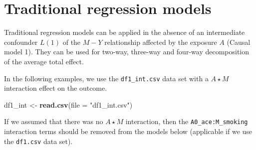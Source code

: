 \documentclass[
]{book}
\newenvironment{Shaded}{\begin{snugshade}}{\end{snugshade}}
\newcommand{\AttributeTok}[1]{\textcolor[rgb]{0.13,0.29,0.53}{#1}}
\newcommand{\CommentTok}[1]{\textcolor[rgb]{0.56,0.35,0.01}{\textit{#1}}}
\newcommand{\FunctionTok}[1]{\textcolor[rgb]{0.13,0.29,0.53}{\textbf{#1}}}
\newcommand{\NormalTok}[1]{#1}
\newcommand{\OtherTok}[1]{\textcolor[rgb]{0.56,0.35,0.01}{#1}}
\newcommand{\SpecialCharTok}[1]{\textcolor[rgb]{0.81,0.36,0.00}{\textbf{#1}}}
\newcommand{\StringTok}[1]{\textcolor[rgb]{0.31,0.60,0.02}{#1}}
\begin{document}
\begin{Shaded}
\end{Shaded}

\chapter{Traditional regression models}\label{ChapTradRegModels}

Traditional regression models can be applied in the absence of an intermediate confounder \(L(1)\) of the \(M-Y\) relationship affected by the exposure \(A\) (Causal model 1). They can be used for two-way, three-way and four-way decomposition of the average total effect.

In the following examples, we use the \texttt{df1\_int.csv} data set with a \(A \star M\) interaction effect on the outcome.

\begin{Shaded}
\begin{Highlighting}[]
\NormalTok{df1\_int }\OtherTok{\textless{}{-}} \FunctionTok{read.csv}\NormalTok{(}\AttributeTok{file =} \StringTok{"df1\_int.csv"}\NormalTok{)}
\end{Highlighting}
\end{Shaded}

If we assumed that there was no \(A \star M\) interaction, then the \texttt{A0\_ace:M\_smoking} interaction terms should be removed from the models below (applicable if we use the \texttt{df1.csv} data set).
\end{document}
